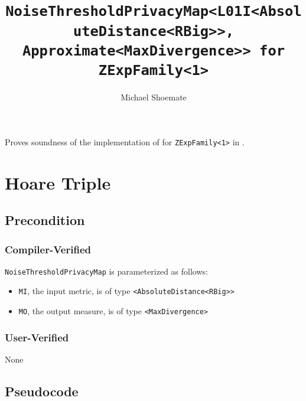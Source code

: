 \documentclass{article}
\title{\texttt{NoiseThresholdPrivacyMap<L01I<AbsoluteDistance<RBig>>, Approximate<MaxDivergence>> for ZExpFamily<1>}}
\author{Michael Shoemate}
\date{}
\begin{document}
\maketitle

\contrib
Proves soundness of the implementation of  for \texttt{ZExpFamily<1>} in .

\section{Hoare Triple}
\subsection*{Precondition}
\subsubsection*{Compiler-Verified}
\texttt{NoiseThresholdPrivacyMap} is parameterized as follows:
\begin{itemize}
    \item \texttt{MI}, the input metric, is of type \texttt{<AbsoluteDistance<RBig>>}
    \item \texttt{MO}, the output measure, is of type \texttt{<MaxDivergence>}
\end{itemize}

\subsubsection*{User-Verified}
None

\subsection*{Pseudocode}

\end{document}
